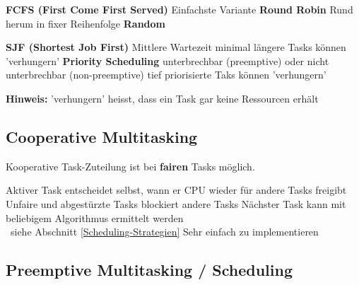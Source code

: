 \begin{minipage}[t]{0.46\columnwidth}
    \raggedright

    \begin{outline}
        \1 \textbf{FCFS (First Come First Served)}
            \2 Einfachste Variante
        \1 \textbf{Round Robin}
            \2 Rund herum in fixer Reihenfolge
        \1 \textbf{Random}
    \end{outline}
\end{minipage}
\hfill
\begin{minipage}[t]{0.5\columnwidth}
    \raggedright

    \begin{outline}
        \1 \textbf{SJF (Shortest Job First)}
            \2[+] Mittlere Wartezeit minimal
            \2[-] längere Tasks können 'verhungern'
        \1 \textbf{Priority Scheduling}
            \2 unterbrechbar (preemptive) oder nicht unterbrechbar (non-preemptive)
            \2[-] tief priorisierte Taks können 'verhungern'
    \end{outline}
\end{minipage}

\vspace{0.1cm}

\textbf{Hinweis:} 'verhungern' heisst, dass ein Task gar keine Ressourcen erhält


\subsection{Cooperative Multitasking}

Kooperative Task-Zuteilung ist bei \textbf{fairen} Tasks möglich.

\vspace{0.1cm}

\begin{outline}
    \1 Aktiver Task entscheidet selbst, wann er CPU wieder für andere Tasks freigibt
        \2 Unfaire und abgestürzte Tasks blockiert andere Tasks
    \1 Nächster Task kann mit beliebigem Algorithmus ermittelt werden \\
        \textrightarrow\ siehe Abschnitt \ref{Scheduling-Strategien}
    \1 Sehr einfach zu implementieren
\end{outline}


\subsection{Preemptive Multitasking / Scheduling}
\label{Preemptive Multitasking / Scheduling}

